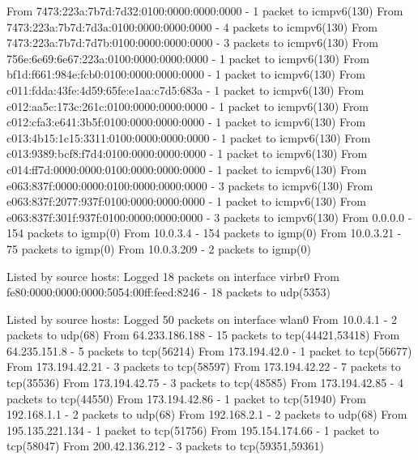    From 7473:223a:7b7d:7d32:0100:0000:0000:0000 - 1 packet to icmpv6(130)
   From 7473:223a:7b7d:7d3a:0100:0000:0000:0000 - 4 packets to icmpv6(130)
   From 7473:223a:7b7d:7d7b:0100:0000:0000:0000 - 3 packets to icmpv6(130)
   From 756e:6e69:6e67:223a:0100:0000:0000:0000 - 1 packet to icmpv6(130)
   From bf1d:f661:984e:fcb0:0100:0000:0000:0000 - 1 packet to icmpv6(130)
   From c011:fdda:43fe:4d59:65fe:e1aa:c7d5:683a - 1 packet to icmpv6(130)
   From c012:aa5c:173c:261c:0100:0000:0000:0000 - 1 packet to icmpv6(130)
   From c012:cfa3:e641:3b5f:0100:0000:0000:0000 - 1 packet to icmpv6(130)
   From c013:4b15:1c15:3311:0100:0000:0000:0000 - 1 packet to icmpv6(130)
   From c013:9389:bcf8:f7d4:0100:0000:0000:0000 - 1 packet to icmpv6(130)
   From c014:ff7d:0000:0000:0100:0000:0000:0000 - 1 packet to icmpv6(130)
   From e063:837f:0000:0000:0100:0000:0000:0000 - 3 packets to icmpv6(130)
   From e063:837f:2077:937f:0100:0000:0000:0000 - 1 packet to icmpv6(130)
   From e063:837f:301f:937f:0100:0000:0000:0000 - 3 packets to icmpv6(130)
   From 0.0.0.0 - 154 packets to igmp(0)
   From 10.0.3.4 - 154 packets to igmp(0)
   From 10.0.3.21 - 75 packets to igmp(0)
   From 10.0.3.209 - 2 packets to igmp(0)

 Listed by source hosts:
 Logged 18 packets on interface virbr0
   From fe80:0000:0000:0000:5054:00ff:feed:8246 - 18 packets to udp(5353)

 Listed by source hosts:
 Logged 50 packets on interface wlan0
   From 10.0.4.1 - 2 packets to udp(68)
   From 64.233.186.188 - 15 packets to tcp(44421,53418)
   From 64.235.151.8 - 5 packets to tcp(56214)
   From 173.194.42.0 - 1 packet to tcp(56677)
   From 173.194.42.21 - 3 packets to tcp(58597)
   From 173.194.42.22 - 7 packets to tcp(35536)
   From 173.194.42.75 - 3 packets to tcp(48585)
   From 173.194.42.85 - 4 packets to tcp(44550)
   From 173.194.42.86 - 1 packet to tcp(51940)
   From 192.168.1.1 - 2 packets to udp(68)
   From 192.168.2.1 - 2 packets to udp(68)
   From 195.135.221.134 - 1 packet to tcp(51756)
   From 195.154.174.66 - 1 packet to tcp(58047)
   From 200.42.136.212 - 3 packets to tcp(59351,59361)

